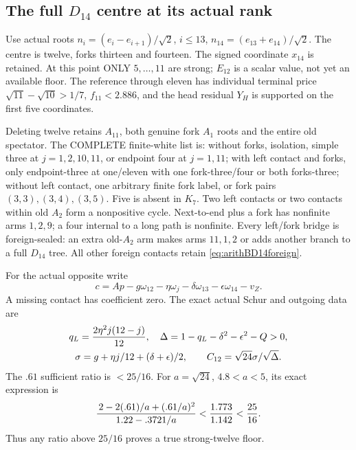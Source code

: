 \documentclass[11pt]{article}
\begin{document}
\subsection{The full \(D_{14}\) centre at its actual rank}
\label{app:arithD14typedcentre}

Use actual roots
\(n_i=(e_i-e_{i+1})/\sqrt2\), \(i\le13\),
\(n_{14}=(e_{13}+e_{14})/\sqrt2\).
The centre is twelve, forks thirteen and fourteen.
The signed coordinate \(x_{14}\) is retained.
At this point ONLY \(5,\ldots,11\) are strong;
\(E_{12}\) is a scalar value, not yet an available floor.
The reference through eleven has individual terminal
price \(\sqrt{11}-\sqrt{10}>1/7\),
\(f_{11}<2.886\), and the head residual \(Y_H\)
is supported on the first five coordinates.

Deleting twelve retains \(A_{11}\), both genuine
fork \(A_1\) roots and the entire old spectator.
The COMPLETE finite-white list is:
without forks, isolation, simple three at
\(j=1,2,10,11\), or endpoint four at \(j=1,11\);
with left contact and forks, only endpoint-three
at one/eleven with one fork-three/four or both
forks-three;
without left contact, one arbitrary finite fork
label, or fork pairs \((3,3),(3,4),(3,5)\).
Five is absent in \(K_7\).
Two left contacts or two contacts within old \(A_2\)
form a nonpositive cycle.
Next-to-end plus a fork has nonfinite arms \(1,2,9\);
a four internal to a long path is nonfinite.
Every left/fork bridge is foreign-sealed:
an extra old-\(A_2\) arm makes arms \(11,1,2\)
or adds another branch to a full \(D_{14}\) tree.
All other foreign contacts retain
\eqref{eq:arithBD14foreign}.

For the actual opposite write
\[
 c=Ap-g\omega_{12}-\eta\omega_j
                   -\delta\omega_{13}-\epsilon\omega_{14}-v_Z .
\]
A missing contact has coefficient zero.
The exact actual Schur and outgoing data are
\[
 \begin{gathered}
 q_L={2\eta^2j(12-j)\over12},\quad
 \Delta=1-q_L-\delta^2-\epsilon^2-Q>0,\\
 \sigma=g+\eta j/12+(\delta+\epsilon)/2,\qquad
 C_{12}=\sqrt{24}\sigma/\sqrt\Delta .
 \end{gathered}
\]
The \(.61\) sufficient ratio is \(<25/16\).
For \(a=\sqrt{24}\), \(4.8<a<5\), its exact
expression is
\[
 {\,2-2(.61)/a+(.61/a)^2\over1.22-.3721/a}
                 <{1.773\over1.142}<{25\over16}.
\]
Thus any ratio above \(25/16\) proves a true
strong-twelve floor.
\end{document}
